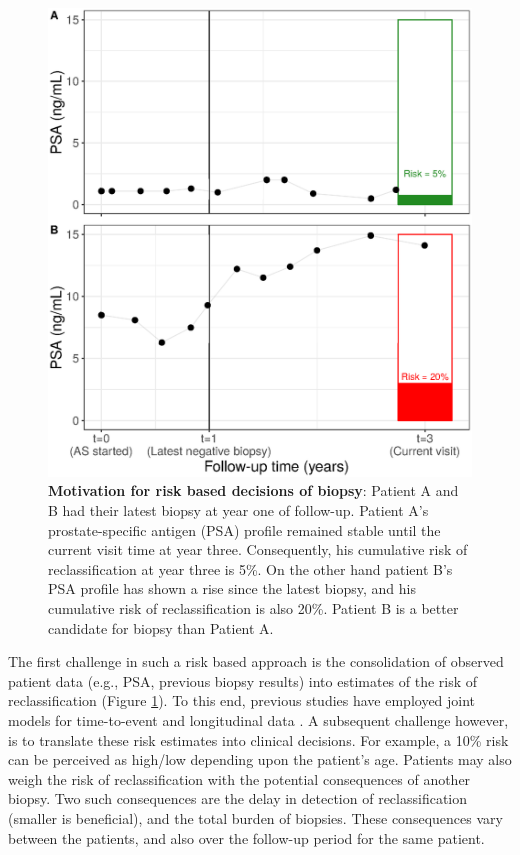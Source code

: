 \begin{figure}[!htb]
\centerline{\includegraphics[width=\columnwidth]{images/riskBasedExample.eps}}
\caption{\textbf{Motivation for risk based decisions of biopsy}: Patient A and B had their latest biopsy at year one of follow-up. Patient A's prostate-specific antigen (PSA) profile remained stable until the current visit time at year three. Consequently, his cumulative risk of reclassification at year three is 5\%. On the other hand patient B's PSA profile has shown a rise since the latest biopsy, and his cumulative risk of reclassification is also 20\%. Patient B is a better candidate for biopsy than Patient A.}
\label{fig:riskBasedExample}
\end{figure}

The first challenge in such a risk based approach is the consolidation of observed patient data (e.g., PSA, previous biopsy results) into estimates of the risk of reclassification (Figure \ref{fig:riskBasedExample}). To this end, previous studies have employed joint models for time-to-event and longitudinal data \citep{tomer2019,coley2017prediction,rizopoulos2012joint}. A subsequent challenge however, is to translate these risk estimates into clinical decisions. For example, a 10\% risk can be perceived as high/low depending upon the patient's age. Patients may also weigh the risk of reclassification with the potential consequences of another biopsy. Two such consequences are the delay in detection of reclassification (smaller is beneficial), and the total burden of biopsies. These consequences vary between the patients, and also over the follow-up period for the same patient.


